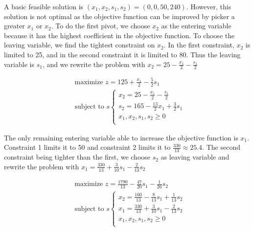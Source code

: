 \documentclass[a4paper, 10pt, twoside]{article}
\begin{document}
\begin{enumerate}[a)]
          A basic feasible solution is $(x_1, x_2, s_1, s_2) = (0, 0, 50, 240)$. However, this solution is not optimal as the objective function can be improved by picker a greater $x_1$ or $x_2$. To do the first pivot, we choose $x_2$ as the entering variable because it has the highest coefficient in the objective function. To choose the leaving variable, we find the tightest constraint on $x_2$. In the first constraint, $x_2$ is limited to 25, and in the second constraint it is limited to 80. Thus the leaving variable is $s_1$, and we rewrite the problem with $x_2 = 25 - \frac{x_1}{2} - \frac{s_1}{2}$

          \begin{align*}
               & \text{maximize } z = 125 + \frac{x_1}{2} - \frac{5}{2}s_1 \\
               & \text{subject to }s
              \begin{cases}
                  x_2 = 25 - \frac{x_1}{2} - \frac{s_1}{2}     \\
                  s_2 = 165 - \frac{13}{2}x_1 + \frac{3}{2}s_1 \\
                  x_1, x_2, s_1, s_2 \ge 0                     \\
              \end{cases}
          \end{align*}

          The only remaining entering variable able to increase the objective function is $x_1$. Constraint 1 limits it to 50 and constraint 2 limits it to $\frac{330}{13} \approx 25.4$. The second constraint being tighter than the first, we choose $s_2$ as leaving variable and rewrite the problem with $x_1=\frac{330}{13}+\frac{3}{10}s_1-\frac{2}{13}s_2$

          \begin{align*}
               & \text{maximize } z = \frac{1790}{13} - \frac{47}{20}s_1 - \frac{1}{26}s_2 \\
               & \text{subject to }s
              \begin{cases}
                  x_2 = \frac{160}{13}-\frac{8}{13}s_1+\frac{1}{13}s_2 \\
                  x_1=\frac{330}{13}+\frac{3}{10}s_1-\frac{2}{13}s_2   \\
                  x_1, x_2, s_1, s_2 \ge 0                             \\
              \end{cases}
          \end{align*}


\end{enumerate}
\end{document}
